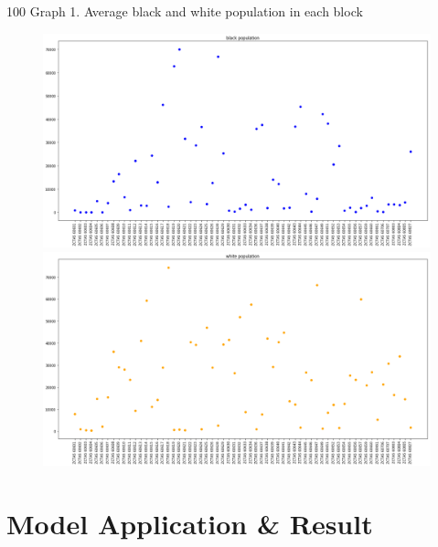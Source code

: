 \documentclass{article}
\begin{document}
\clearpage
\centerline{{\color{white} 100} Graph 1. Average black and white population in each block}
\begin{figure}[!h] 
\centering 
\includegraphics[width=1.2\textwidth]{graph1.png} 
\includegraphics[width=1.2\textwidth]{graph2.png} 
\end{figure}

\section{Model Application \& Result}
\end{document}
